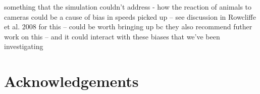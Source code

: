 \documentclass[a4paper,12pt,twoside]{report}
\begin{document}
	
	something that the simulation couldn't address - how the reaction of animals to cameras could be a cause of bias in speeds picked up -- see discussion in Rowcliffe et al. 2008 for this -- could be worth bringing up bc they also recommend futher work on this -- and it could interact with these biases that we've been investigating 
	
	
	

	\section{Acknowledgements}

	
	
	
\end{document}
